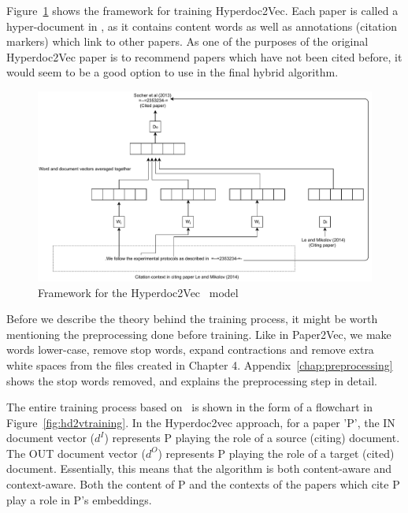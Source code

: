 Figure~\ref{fig:hd2v} shows the framework for training Hyperdoc2Vec.
Each paper is called a hyper-document in \cite{ShiSZZH18}, as it contains content words as well as annotations (citation markers) which link to other papers. As one of the purposes of the original Hyperdoc2Vec paper is to recommend papers which have not been cited before, it would seem to be a good option to use in the final hybrid algorithm. 
\begin{figure}
\centering
 \includegraphics[keepaspectratio, width=13cm]{figures/Approach/hd2v.pdf}
  \caption{Framework for the Hyperdoc2Vec~\cite{ShiSZZH18} model}
  \label{fig:hd2v}
\end{figure}

Before we describe the theory behind the training process, it might be worth mentioning the preprocessing done before training. Like in Paper2Vec, we make words lower-case, remove stop words, expand contractions and remove extra white spaces from the files created in Chapter 4. Appendix~\ref{chap:preprocessing} shows the stop words removed, and explains the preprocessing step in detail.

The entire training process based on~\cite{ShiSZZH18} is shown in the form of a flowchart in Figure~\ref{fig:hd2vtraining}.
In the Hyperdoc2vec approach, for a paper 'P', the IN document vector ($d^I$) represents P playing the role of a source (citing) document. The OUT document vector ($d^O$) represents P playing the role of a target (cited) document. Essentially, this means that the algorithm is both content-aware and context-aware. Both the content of P and the contexts of the papers which cite P play a role in P's embeddings. 

